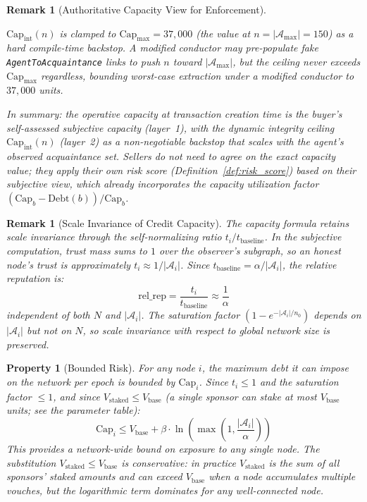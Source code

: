 \documentclass[11pt]{article}
\newtheorem{remark}[theorem]{Remark}
\newtheorem{property}{Property}[section]
\begin{document}
\begin{remark}[Authoritative Capacity View for Enforcement]
\begin{enumerate}
    $\text{Cap}_{\text{int}}(n)$ is clamped to $\text{Cap}_{\max} = 37{,}000$ (the value at $n = |\mathcal{A}_{\max}| = 150$) as a hard compile-time backstop. A modified conductor may pre-populate fake \texttt{AgentToAcquaintance} links to push $n$ toward $|\mathcal{A}_{\max}|$, but the ceiling never exceeds $\text{Cap}_{\max}$ regardless, bounding worst-case extraction under a modified conductor to $37{,}000$ units.
\end{enumerate}
In summary: the \emph{operative} capacity at transaction creation time is the buyer's self-assessed subjective capacity (layer~1), with the dynamic integrity ceiling $\text{Cap}_{\text{int}}(n)$ (layer~2) as a non-negotiable backstop that scales with the agent's observed acquaintance set. Sellers do not need to agree on the exact capacity value; they apply their own risk score (Definition~\ref{def:risk_score}) based on their subjective view, which already incorporates the capacity utilization factor $(\text{Cap}_b - \text{Debt}(b)) / \text{Cap}_b$.
\end{remark}

\begin{remark}[Scale Invariance of Credit Capacity]\label{rem:capacity_scale}
The capacity formula retains scale invariance through the self-normalizing ratio $t_i / t_{\text{baseline}}$. In the subjective computation, trust mass sums to $1$ over the observer's subgraph, so an honest node's trust is approximately $t_i \approx 1/|\mathcal{A}_i|$. Since $t_{\text{baseline}} = \alpha / |\mathcal{A}_i|$, the relative reputation is:
\begin{equation}
    \text{rel\_rep} = \frac{t_i}{t_{\text{baseline}}} \approx \frac{1}{\alpha}
\end{equation}
independent of both $N$ and $|\mathcal{A}_i|$. The saturation factor $(1 - e^{-|\mathcal{A}_i|/n_0})$ depends on $|\mathcal{A}_i|$ but not on $N$, so scale invariance with respect to global network size is preserved.
\end{remark}

\begin{property}[Bounded Risk]
For any node $i$, the maximum debt it can impose on the network per epoch is bounded by $\text{Cap}_i$. Since $t_i \leq 1$ and the saturation factor $\leq 1$, and since $V_{\text{staked}} \leq V_{\text{base}}$ (a single sponsor can stake at most $V_{\text{base}}$ units; see the parameter table):
\begin{equation}
    \text{Cap}_i \leq V_{\text{base}} + \beta \cdot \ln\left(\max\left(1, \frac{|\mathcal{A}_i|}{\alpha}\right)\right)
\end{equation}
This provides a network-wide bound on exposure to any single node. The substitution $V_{\text{staked}} \leq V_{\text{base}}$ is conservative: in practice $V_{\text{staked}}$ is the sum of all sponsors' staked amounts and can exceed $V_{\text{base}}$ when a node accumulates multiple vouches, but the logarithmic term dominates for any well-connected node.
\end{property}
\end{document}
